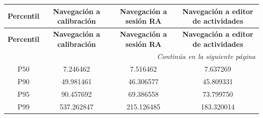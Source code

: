 \begin{longtable}{@{}cccc@{}}

\toprule
\textbf{Percentil} &
\textbf{Navegación a calibración} &
\textbf{Navegación a sesión RA} &
\textbf{Navegación a editor de actividades} \\
\toprule
\endfirsthead

\toprule
\textbf{Percentil} &
\textbf{Navegación a calibración} &
\textbf{Navegación a sesión RA} &
\textbf{Navegación a editor de actividades} \\
\toprule
\endhead

\midrule[\heavyrulewidth]
\multicolumn{4}{r}{\textit{Continúa en la siguiente página}}\\
\endfoot

\bottomrule
\endlastfoot

P50 & 7.246462 & 7.516462 & 7.637269 \\
P90 & 49.981461 & 46.306577 & 45.809331 \\
P95 & 90.457692 & 69.386558 & 73.799750 \\
P99 & 537.262847 & 215.126485 & 183.320014 \\

\end{longtable}